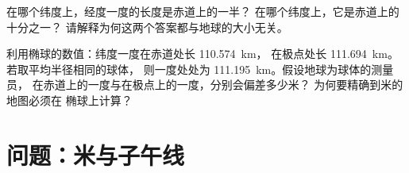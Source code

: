 \begin{exercise}[$\star\star\star$]\label{exo:g10:measuring-the-earth:14}
在哪个纬度上，经度一度的长度是赤道上的一半？
在哪个纬度上，它是赤道上的十分之一？
请解释为何这两个答案都与地球的大小无关。
\end{exercise}

\begin{exercise}[$\star\star\star$]\label{exo:g10:measuring-the-earth:15}
利用椭球的数值：纬度一度在赤道处长 \qty{110.574}{km}，
在极点处长 \qty{111.694}{km}。若取平均半径相同的球体，
则一度处处为 \qty{111.195}{km}。假设地球为球体的测量员，
在赤道上的一度与在极点上的一度，分别会偏差多少米？
为何要精确到米的地图必须在
椭球上计算？
\end{exercise}

\section{问题：米与子午线}

